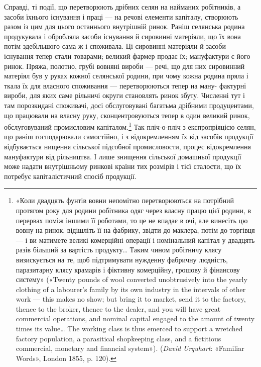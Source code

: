 Справді, ті події, що перетворюють дрібних селян на найманих
робітників, а засоби їхнього існування і праці — на речові
елементи капіталу, створюють разом із цим для цього останнього
внутрішній ринок. Раніш селянська родина продукувала
і обробляла засоби існування й сировинні матеріяли, що їх вона
потім здебільшого сама ж і споживала. Ці сировинні матеріяли
й засоби існування тепер стали товарами; великий фармер продає
їх; мануфактури є його ринок. Пряжа, полотно, грубі вовняні
вироби — речі, що для них сировинний матеріял був у руках
кожної селянської родини, при чому кожна родина пряла і ткала
їх для власного споживання — перетворюються тепер на ману-
фактурні вироби, для яких саме рільничі округи становлять
ринок збуту. Численні тут і там порозкидані споживачі, досі
обслуговувані багатьма дрібними продуцентами, що працювали
на власну руку, сконцентровуються тепер в один великий ринок,
обслуговуваний промисловим капіталом.\footnote{
«Коли двадцять фунтів вовни непомітно перетворюються на потрібний
протягом року для родини робітника одяг через власну працю
цієї родини, в перервах поміж іншими її роботами, то це не впадає в очі,
але винесіть цю вовну на ринок, відішліть її на фабрику, звідти до маклера,
потім до торгівця — і ви матимете великі комерційні операції і
номінальний капітал у двадцять разів більший за вартість продукту\dots{}
Таким чином робітничу клясу визискується на те, щоб підтримувати
нужденну фабричну людність, паразитарну клясу крамарів і фіктивну
комерційну, грошову й фінансову систему» («Twenty pounds of wool
converted unobtrusively into the yearly clothing of a labourer’s family
by its own industry in the intervals of other work — this makes no show;
but bring it to market, send it to the factory, thence to the broker, thence
to the dealer, and you will have great commercial operations, and nominal
capital engaged to the amount of twenty times its value\dots{} The working
class is thus emerced to support a wretched factory population, a parasitical
shopkeeping class, and a fictitious commercial, monetary and financial
system»). (\emph{David Urquhart}: «Familiar Words», London 1855, p. 120).
} Так пліч-о-пліч
з експропріяцією селян, що раніш господарювали самостійно, і
з відокремленням їх від засобів продукції відбувається нищення
сільської підсобної промисловости, процес відокремлення мануфактури
від рільництва. І лише знищення сільської домашньої
продукції може надати внутрішньому ринкові країни тих розмірів
і тієї сталости, що їх потребує капіталістичний спосіб продукції.

